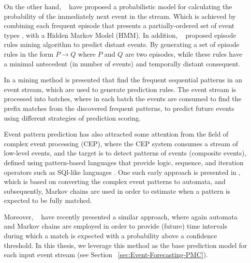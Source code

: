 \par On the other hand, ~\citet{laxman_stream_2008} have proposed a probabilistic model
for calculating the probability of the immediately next event in the stream. Which is achieved by combining each frequent episode that presents a partially-ordered set of event types \cite{mannila1997discovery}, with a Hidden Markov Model (HMM). In addition, ~\citet{fahed_efficient_2014} proposed episode rules mining algorithm to predict distant events. By generating a set of episode rules in the form \(P \rightarrow Q \) where $P$ and $Q$ are two episodes, while these rules have a minimal antecedent (in number of events) and temporally distant  consequent.

\par In \cite{zhou_pattern_2015} a mining method is presented that find the frequent sequential patterns in an event stream, which are used to generate prediction rules. The event stream is processed into batches, where in each batch the events are consumed to find the prefix matches from the discovered frequent patterns, to predict future events using different strategies of prediction scoring.

\par Event pattern prediction has also attracted some attention from the field of complex event processing (CEP), where the CEP system consumes a stream of low-level events, and the target is to detect patterns of events (composite events), defined using pattern-based languages that provide logic, sequence, and iteration operators such as SQl-like languages \cite{Cugola:2012:PFI:2187671.2187677}. One such early approach is presented in \cite{muthusamy_predictive_2010}, which is based on converting the complex event patterns to automata, and subsequently, Markov chains are used in order to estimate when a pattern is expected to be fully matched. 
\par Moreover, ~\citet{alevizos2017event} have recently presented a similar approach, where again automata and Markov chains are employed in order to provide (future) time intervals during which a match is expected with a probability above a confidence threshold. In this thesis, we leverage this method as the base prediction model for each input event stream (see Section ~\ref{sec:Event-Forecasting-PMC}). 